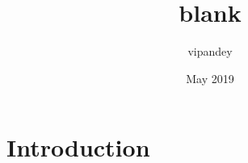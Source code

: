 \documentclass{article}
\title{blank}
\author{vipandey }
\date{May 2019}
\begin{document}
\maketitle

\section{Introduction}
\end{document}
